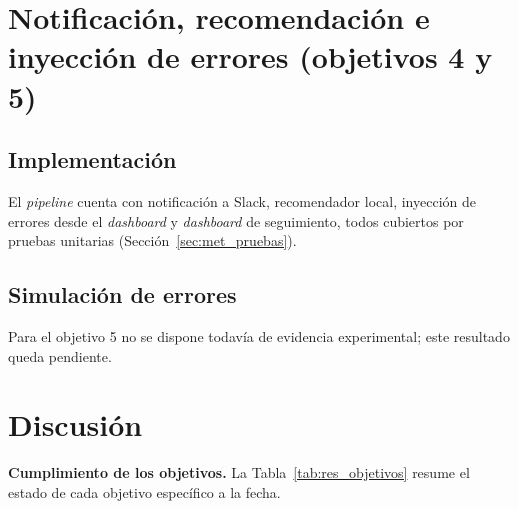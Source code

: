 \section{Notificación, recomendación e inyección de errores (objetivos 4 y 5)}\label{sec:res_reaccion}

\subsection{Implementación}

El \textit{pipeline} cuenta con notificación a Slack, recomendador local, inyección de errores desde el \textit{dashboard} y \textit{dashboard} de seguimiento, todos cubiertos por pruebas unitarias (Sección~\ref{sec:met_pruebas}). %

\subsection{Simulación de errores}

Para el objetivo 5 no se dispone todavía de evidencia experimental; este resultado queda pendiente.

\section{Discusión}\label{sec:res_discusion}

\textbf{Cumplimiento de los objetivos.} La Tabla~\ref{tab:res_objetivos} resume el estado de cada objetivo específico a la fecha.


